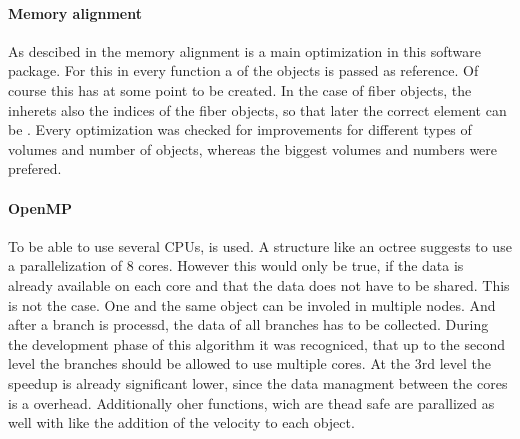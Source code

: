 \paragraph{Memory alignment}
As descibed in  the memory alignment is a main optimization in this software package.
For this in every function a  of the objects is passed as reference.
Of course this  has at some point to be created.
In the case of fiber objects, the  inherets also the indices of the fiber objects, so that later the correct element can be \dummy{}.
%
Every optimization was checked for improvements for different types of volumes and number of objects, whereas the biggest volumes and numbers were prefered.
%
%
\paragraph{OpenMP}
%
To be able to use several \acp{CPU}, \openmp{} is used.
A structure like an octree suggests to use a parallelization of 8 cores.
However this would only be true, if the data is already available on each core and that the data does not have to be shared.
This is not the case.
One and the same object can be involed in multiple nodes.
And after a branch is processd, the data of all branches has to be collected.
During the development phase of this algorithm it was recogniced, that up to the second level the branches should be allowed to use multiple cores. At the 3rd level the speedup is already significant lower, since the data managment between the cores is a overhead.
Additionally oher functions, wich are thead safe are parallized as well with \openmp{} like \eg{} the addition of the velocity to each object.
%
%
%

